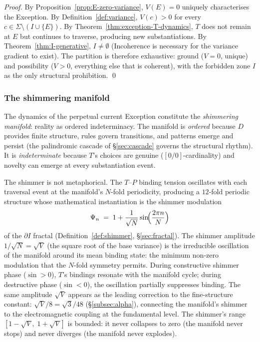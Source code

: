 \documentclass[11pt,a4paper]{article}
\theoremstyle{definition}
\theoremstyle{remark}
\begin{document}
\begin{proof}
By Proposition~\ref{prop:E-zero-variance}, $V(E) = 0$ uniquely characterises the Exception. By Definition~\ref{def:variance}, $V(c) > 0$ for every $c \in \Sigma \setminus (I \cup \{E\})$. By Theorem~\ref{thm:exception-T-dynamics}, $T$ does not remain at $E$ but continues to traverse, producing new substantiations. By Theorem~\ref{thm:I-generative}, $I \neq \emptyset$ (Incoherence is necessary for the variance gradient to exist). The partition is therefore exhaustive: ground ($V = 0$, unique) and possibility ($V > 0$, everything else that is coherent), with the forbidden zone $I$ as the only structural prohibition. \qed
\end{proof}

\subsubsection{The shimmering manifold}\label{subsubsec:shimmer-manifold}

The dynamics of the perpetual current Exception constitute the \emph{shimmering manifold}: reality as ordered indeterminacy. The manifold is \emph{ordered} because $D$ provides finite structure, rules govern transitions, and patterns emerge and persist (the palindromic cascade of \S\ref{sec:cascade} governs the structural rhythm). It is \emph{indeterminate} because $T$'s choices are genuine ($[0/0]$-cardinality) and novelty can emerge at every substantiation event.

The shimmer is not metaphorical. The $T$--$P$ binding tension oscillates with each traversal event at the manifold's $N$-fold periodicity, producing a $12$-fold periodic structure whose mathematical instantiation is the shimmer modulation
\[
\Psi_{n} \;=\; 1 + \frac{1}{\sqrt{N}}\sin\!\Bigl(\frac{2\pi n}{N}\Bigr)
\]
of the $\partial I$ fractal (Definition~\ref{def:shimmer}, \S\ref{sec:fractal}). The shimmer amplitude $1/\sqrt{N} = \sqrt{V}$ (the square root of the base variance) is the irreducible oscillation of the manifold around its mean binding state: the minimum non-zero modulation that the $N$-fold symmetry permits. During constructive shimmer phase ($\sin > 0$), $T$'s bindings resonate with the manifold cycle; during destructive phase ($\sin < 0$), the oscillation partially suppresses binding. The same amplitude $\sqrt{V}$ appears as the leading correction to the fine-structure constant: $\sqrt{V}/8 = \sqrt{3}/48$ (\S\ref{subsec:alpha}), connecting the manifold's shimmer to the electromagnetic coupling at the fundamental level. The shimmer's range $[1 - \sqrt{V},\; 1 + \sqrt{V}]$ is bounded: it never collapses to zero (the manifold never stops) and never diverges (the manifold never explodes).
\end{document}
